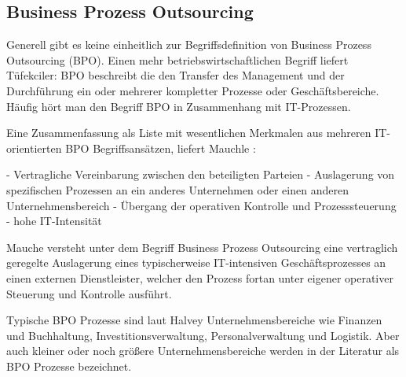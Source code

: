 \subsection{Business Prozess Outsourcing }
Generell gibt es keine einheitlich zur Begriffsdefinition von Business Prozess Outsourcing (BPO). 
Einen mehr betriebswirtschaftlichen Begriff liefert Tüfekciler:
BPO beschreibt die den Transfer des Management und der Durchführung ein oder mehrerer kompletter Prozesse oder Geschäftsbereiche.  \cite[14]{tuefekciler2011human}
Häufig hört man den Begriff BPO in Zusammenhang mit IT-Prozessen. 

Eine Zusammenfassung als Liste mit wesentlichen Merkmalen aus mehreren IT-orientierten BPO Begriffsansätzen, liefert Mauchle \cite[6]{mauchle2012business}:

- Vertragliche Vereinbarung zwischen den beteiligten Parteien
- Auslagerung von spezifischen Prozessen an ein anderes Unternehmen oder einen anderen Unternehmensbereich
- Übergang der operativen Kontrolle und Prozesssteuerung
- hohe IT-Intensität

Mauche versteht unter dem Begriff Business Prozess Outsourcing eine vertraglich geregelte Auslagerung eines typischerweise IT-intensiven Geschäftsprozesses an einen externen Dienstleister, welcher den Prozess fortan unter eigener operativer Steuerung und Kontrolle ausführt.
\cite[3]{mauchle2012business}

Typische BPO Prozesse sind laut Halvey Unternehmensbereiche wie Finanzen und Buchhaltung, Investitionsverwaltung, Personalverwaltung und Logistik. Aber auch kleiner oder noch größere Unternehmensbereiche werden in der Literatur als BPO Prozesse bezeichnet. \cite[4]{halvey2007business}
 







